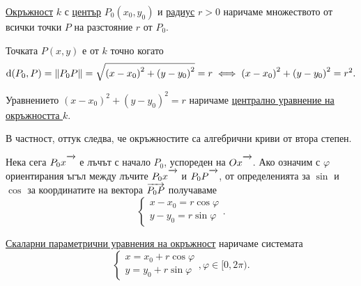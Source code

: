 \documentclass[numbers=endperiod, DIV=15, bibliography=totocnumbered]{scrartcl}
\begin{document}
\begin{definition}
  \uline{Окръжност} $k$ с \uline{център} $P_0(x_0, y_0)$ и \uline{радиус} $r > 0$ наричаме множеството от всички точки $P$ на разстояние $r$ от $P_0$.

  Точката $P(x, y)$ е от $k$ точно когато
  \begin{displaymath}
    \operatorname{d}(P_0, P)
    =
    \left\Vert P_0 P \right\Vert
    =
    \sqrt{{(x - x_0)}^2 + {(y - y_0)}^2} = r
    \iff
    {(x - x_0)}^2 + {(y - y_0)}^2 = r^2.
  \end{displaymath}

  Уравнението ${(x - x_0)}^2 + {(y - y_0)}^2 = r$ наричаме \uline{централно уравнение на окръжността $k$}.

  В частност, оттук следва, че окръжностите са алгебрични криви от втора степен.

  \bigskip
  \begin{minipage}{0.5\textwidth}
    Нека сега $P_0 x\Ray$ е лъчът с начало $P_0$, успореден на $Ox\Ray$. Ако означим с $\varphi$ ориентирания ъгъл между лъчите $P_0x\Ray$ и $P_0 P\Ray$, от определенията за $\sin$ и $\cos$ за координатите на вектора $\overrightarrow{P_0 P}$ получаваме
    \begin{displaymath}
      \begin{cases}
        x - x_0 = r \cos \varphi \\
        y - y_0 = r \sin \varphi
      \end{cases}.
    \end{displaymath}

    \uline{Скаларни параметрични уравнения на окръжност} наричаме системата
    \begin{displaymath}
      \begin{cases}
        x = x_0 + r \cos \varphi \\
        y = y_0 + r \sin \varphi
      \end{cases},
      \varphi \in [0, 2\pi).
    \end{displaymath}
  \end{minipage}
  \begin{minipage}{0.5\textwidth}
    \begin{figure}[H]
      \begin{center}
\end{center}
\end{figure}
\end{minipage}
\end{definition}
\end{document}
